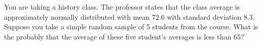 \documentclass[12pt,letterpaper]{exam}
\begin{document}
\begin{questions}
\newpage
\question[10] You are taking a history class. The professor states that the class average is approximately normally distributed with mean 72.6 with standard deviation 8.3. Suppose you take a simple random sample of 5 students from the course. What is the probably that the average of these five student's averages is less than 65?


\end{questions}
\end{document}

